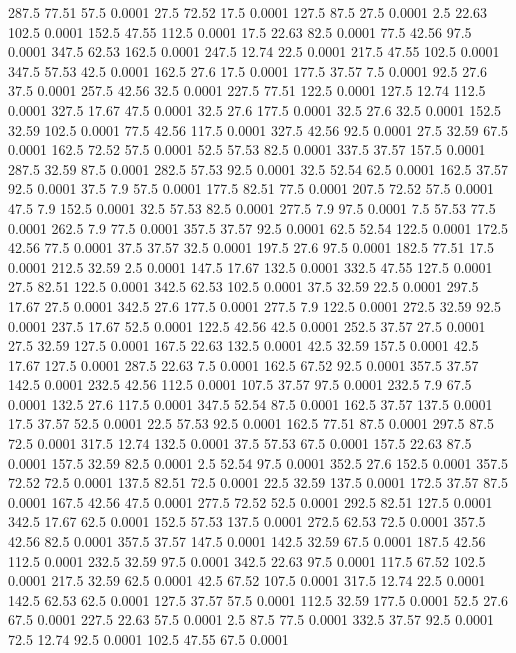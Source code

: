 287.5	77.51	57.5	0.0001
27.5	72.52	17.5	0.0001
127.5	87.5	27.5	0.0001
2.5	22.63	102.5	0.0001
152.5	47.55	112.5	0.0001
17.5	22.63	82.5	0.0001
77.5	42.56	97.5	0.0001
347.5	62.53	162.5	0.0001
247.5	12.74	22.5	0.0001
217.5	47.55	102.5	0.0001
347.5	57.53	42.5	0.0001
162.5	27.6	17.5	0.0001
177.5	37.57	7.5	0.0001
92.5	27.6	37.5	0.0001
257.5	42.56	32.5	0.0001
227.5	77.51	122.5	0.0001
127.5	12.74	112.5	0.0001
327.5	17.67	47.5	0.0001
32.5	27.6	177.5	0.0001
32.5	27.6	32.5	0.0001
152.5	32.59	102.5	0.0001
77.5	42.56	117.5	0.0001
327.5	42.56	92.5	0.0001
27.5	32.59	67.5	0.0001
162.5	72.52	57.5	0.0001
52.5	57.53	82.5	0.0001
337.5	37.57	157.5	0.0001
287.5	32.59	87.5	0.0001
282.5	57.53	92.5	0.0001
32.5	52.54	62.5	0.0001
162.5	37.57	92.5	0.0001
37.5	7.9	57.5	0.0001
177.5	82.51	77.5	0.0001
207.5	72.52	57.5	0.0001
47.5	7.9	152.5	0.0001
32.5	57.53	82.5	0.0001
277.5	7.9	97.5	0.0001
7.5	57.53	77.5	0.0001
262.5	7.9	77.5	0.0001
357.5	37.57	92.5	0.0001
62.5	52.54	122.5	0.0001
172.5	42.56	77.5	0.0001
37.5	37.57	32.5	0.0001
197.5	27.6	97.5	0.0001
182.5	77.51	17.5	0.0001
212.5	32.59	2.5	0.0001
147.5	17.67	132.5	0.0001
332.5	47.55	127.5	0.0001
27.5	82.51	122.5	0.0001
342.5	62.53	102.5	0.0001
37.5	32.59	22.5	0.0001
297.5	17.67	27.5	0.0001
342.5	27.6	177.5	0.0001
277.5	7.9	122.5	0.0001
272.5	32.59	92.5	0.0001
237.5	17.67	52.5	0.0001
122.5	42.56	42.5	0.0001
252.5	37.57	27.5	0.0001
27.5	32.59	127.5	0.0001
167.5	22.63	132.5	0.0001
42.5	32.59	157.5	0.0001
42.5	17.67	127.5	0.0001
287.5	22.63	7.5	0.0001
162.5	67.52	92.5	0.0001
357.5	37.57	142.5	0.0001
232.5	42.56	112.5	0.0001
107.5	37.57	97.5	0.0001
232.5	7.9	67.5	0.0001
132.5	27.6	117.5	0.0001
347.5	52.54	87.5	0.0001
162.5	37.57	137.5	0.0001
17.5	37.57	52.5	0.0001
22.5	57.53	92.5	0.0001
162.5	77.51	87.5	0.0001
297.5	87.5	72.5	0.0001
317.5	12.74	132.5	0.0001
37.5	57.53	67.5	0.0001
157.5	22.63	87.5	0.0001
157.5	32.59	82.5	0.0001
2.5	52.54	97.5	0.0001
352.5	27.6	152.5	0.0001
357.5	72.52	72.5	0.0001
137.5	82.51	72.5	0.0001
22.5	32.59	137.5	0.0001
172.5	37.57	87.5	0.0001
167.5	42.56	47.5	0.0001
277.5	72.52	52.5	0.0001
292.5	82.51	127.5	0.0001
342.5	17.67	62.5	0.0001
152.5	57.53	137.5	0.0001
272.5	62.53	72.5	0.0001
357.5	42.56	82.5	0.0001
357.5	37.57	147.5	0.0001
142.5	32.59	67.5	0.0001
187.5	42.56	112.5	0.0001
232.5	32.59	97.5	0.0001
342.5	22.63	97.5	0.0001
117.5	67.52	102.5	0.0001
217.5	32.59	62.5	0.0001
42.5	67.52	107.5	0.0001
317.5	12.74	22.5	0.0001
142.5	62.53	62.5	0.0001
127.5	37.57	57.5	0.0001
112.5	32.59	177.5	0.0001
52.5	27.6	67.5	0.0001
227.5	22.63	57.5	0.0001
2.5	87.5	77.5	0.0001
332.5	37.57	92.5	0.0001
72.5	12.74	92.5	0.0001
102.5	47.55	67.5	0.0001
